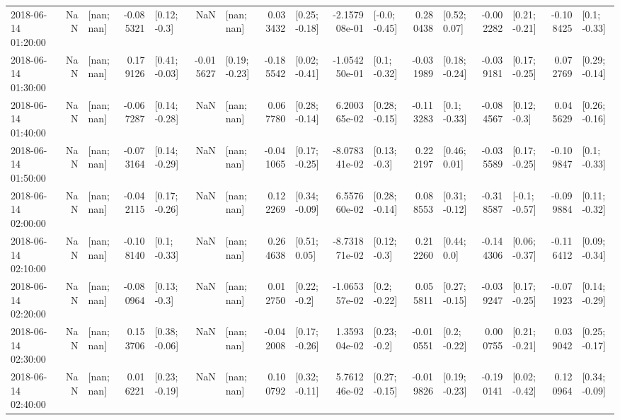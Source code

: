 \begin{tabular}{lrlrlrlrlrlrlrlrl}
2018-06-14 01:20:00 &       NaN &      [nan; nan] & -0.085321 &    [0.12; -0.3] &       NaN &      [nan; nan] &  0.033432 &   [0.25; -0.18] & -2.157908e-01 &   [-0.0; -0.45] &  0.280438 &    [0.52; 0.07] & -0.002282 &   [0.21; -0.21] & -0.108425 &    [0.1; -0.33] \\
2018-06-14 01:30:00 &       NaN &      [nan; nan] &  0.179126 &   [0.41; -0.03] & -0.015627 &   [0.19; -0.23] & -0.185542 &   [0.02; -0.41] & -1.054250e-01 &    [0.1; -0.32] & -0.031989 &   [0.18; -0.24] & -0.039181 &   [0.17; -0.25] &  0.072769 &   [0.29; -0.14] \\
2018-06-14 01:40:00 &       NaN &      [nan; nan] & -0.067287 &   [0.14; -0.28] &       NaN &      [nan; nan] &  0.067780 &   [0.28; -0.14] &  6.200365e-02 &   [0.28; -0.15] & -0.113283 &    [0.1; -0.33] & -0.084567 &    [0.12; -0.3] &  0.045629 &   [0.26; -0.16] \\
2018-06-14 01:50:00 &       NaN &      [nan; nan] & -0.073164 &   [0.14; -0.29] &       NaN &      [nan; nan] & -0.041065 &   [0.17; -0.25] & -8.078341e-02 &    [0.13; -0.3] &  0.222197 &    [0.46; 0.01] & -0.035589 &   [0.17; -0.25] & -0.109847 &    [0.1; -0.33] \\
2018-06-14 02:00:00 &       NaN &      [nan; nan] & -0.042115 &   [0.17; -0.26] &       NaN &      [nan; nan] &  0.122269 &   [0.34; -0.09] &  6.557660e-02 &   [0.28; -0.14] &  0.088553 &   [0.31; -0.12] & -0.318587 &   [-0.1; -0.57] & -0.099884 &   [0.11; -0.32] \\
2018-06-14 02:10:00 &       NaN &      [nan; nan] & -0.108140 &    [0.1; -0.33] &       NaN &      [nan; nan] &  0.264638 &    [0.51; 0.05] & -8.731871e-02 &    [0.12; -0.3] &  0.212260 &     [0.44; 0.0] & -0.144306 &   [0.06; -0.37] & -0.116412 &   [0.09; -0.34] \\
2018-06-14 02:20:00 &       NaN &      [nan; nan] & -0.080964 &    [0.13; -0.3] &       NaN &      [nan; nan] &  0.012750 &    [0.22; -0.2] & -1.065357e-02 &    [0.2; -0.22] &  0.055811 &   [0.27; -0.15] & -0.039247 &   [0.17; -0.25] & -0.071923 &   [0.14; -0.29] \\
2018-06-14 02:30:00 &       NaN &      [nan; nan] &  0.153706 &   [0.38; -0.06] &       NaN &      [nan; nan] & -0.042008 &   [0.17; -0.26] &  1.359304e-02 &    [0.23; -0.2] & -0.010551 &    [0.2; -0.22] &  0.000755 &   [0.21; -0.21] &  0.039042 &   [0.25; -0.17] \\
2018-06-14 02:40:00 &       NaN &      [nan; nan] &  0.016221 &   [0.23; -0.19] &       NaN &      [nan; nan] &  0.100792 &   [0.32; -0.11] &  5.761246e-02 &   [0.27; -0.15] & -0.019826 &   [0.19; -0.23] & -0.190141 &   [0.02; -0.42] &  0.120964 &   [0.34; -0.09] \\

\end{tabular}
